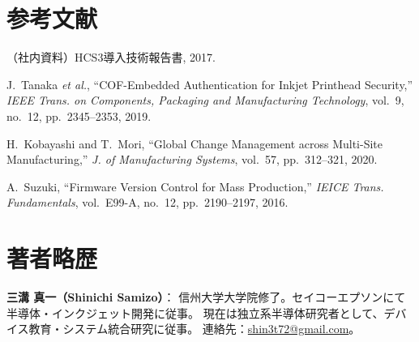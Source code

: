\documentclass[journal,twocolumn]{IEEEtran}
\begin{document}
\section*{参考文献}
\begin{thebibliography}{99}
（社内資料）HCS3導入技術報告書, 2017.

J.~Tanaka \emph{et al.}, ``COF-Embedded Authentication for Inkjet Printhead Security,''
\emph{IEEE Trans. on Components, Packaging and Manufacturing Technology},
vol.~9, no.~12, pp.~2345--2353, 2019.

H.~Kobayashi and T.~Mori, ``Global Change Management across Multi-Site Manufacturing,''
\emph{J. of Manufacturing Systems}, vol.~57, pp.~312--321, 2020.

A.~Suzuki, ``Firmware Version Control for Mass Production,''
\emph{IEICE Trans. Fundamentals}, vol.~E99-A, no.~12, pp.~2190--2197, 2016.
\end{thebibliography}

\section*{著者略歴}
\noindent\textbf{三溝 真一（Shinichi Samizo）}：
信州大学大学院修了。セイコーエプソンにて半導体・インクジェット開発に従事。
現在は独立系半導体研究者として、デバイス教育・システム統合研究に従事。
連絡先：\href{mailto:shin3t72@gmail.com}{shin3t72@gmail.com}。
\end{document}
